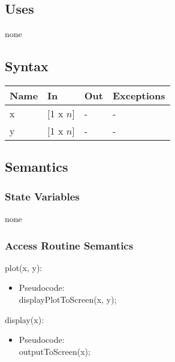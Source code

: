 \documentclass[12pt, titlepage]{article}
\begin{document}
\subsection{Uses}

none

\subsection{Syntax}

\begin{center}
\begin{tabular}{p{4cm} p{4cm} p{4cm} p{2cm}}
\hline
\textbf{Name} & \textbf{In} & \textbf{Out} & \textbf{Exceptions} \\
\hline
x & [1 x $n$] & - & - \\
y & [1 x $n$] & - & - \\
\hline
\end{tabular}
\end{center}

\subsection{Semantics}

\subsubsection{State Variables}
none

\subsubsection{Access Routine Semantics}
plot(x, y):
\begin{itemize}
\item Pseudocode:\\
displayPlotToScreen(x, y); 
\end{itemize}
display(x):
\begin{itemize}
\item Pseudocode:\\
outputToScreen(x); 
\end{itemize}

\newpage
\end{document}
